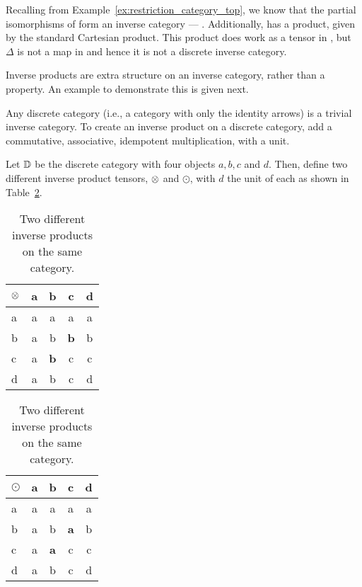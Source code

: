 \begin{example}\label{ex:topcat_does_not_give_a_discrete_inverse_category}
  Recalling \topcatp from Example~\ref{ex:restriction_category_top}, we know that the partial
  isomorphisms of \topcatp form an inverse category --- \Inv{\topcatp}. Additionally, \topcatp has a
  product, given by the standard Cartesian product. This product does work as a tensor in
  \Inv{\topcatp}, but $\Delta$  is not a map in \Inv{\topcat} and hence it is not a discrete inverse
  category.
\end{example}

Inverse products are extra structure on an inverse category, rather than a property. An example to
demonstrate this is given next.

\begin{example}
  \label{example:invprodisstructure}
\end{example}
Any discrete category (i.e., a category with only the identity arrows) is a trivial inverse
category. To create an inverse product on a discrete category, add a commutative, associative,
idempotent multiplication, with a unit.

Let $\mathbb{D}$ be the discrete category with four objects $a,b,c$ and $d$. Then, define
two different inverse product tensors, $\otimes$ and $\odot$, with $d$ the unit of each as shown in
Table~\ref{tab:two_different_inverse_products}.

\begin{table}[!htbp]
  \begin{center}
  \begin{tabular}{|l||c|c|c|c|}
    \hline
    $\otimes$&a&b&c&d\\ \hline \hline
    a&a&a&a&a\\ \hline
    b&a&b&\textbf{b}&b\\ \hline
    c&a&\textbf{b}&c&c \\ \hline
    d&a&b&c&d \\ \hline
  \end{tabular}
  \qquad
  \begin{tabular}{|l||c|c|c|c|} \hline
    $\odot$&a&b&c&d\\ \hline \hline
    a&a&a&a&a\\ \hline
    b&a&b&\textbf{a}&b\\ \hline
    c&a&\textbf{a}&c&c \\ \hline
    d&a&b&c&d \\ \hline
  \end{tabular}
  \end{center}
  \caption{Two different inverse products on the same category.}
  \label{tab:two_different_inverse_products}
\end{table}

